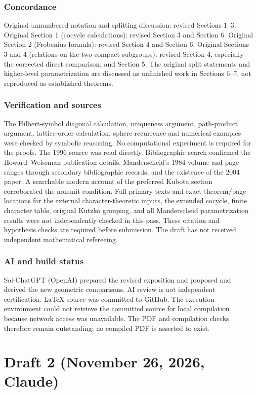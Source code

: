 \documentclass[12pt,letterpaper]{article}
\begin{document}
\section{Concordance}
Original unnumbered notation and splitting discussion: revised Sections 1--3.
Original Section 1 (cocycle calculations): revised Section 3 and Section 6.
Original Section 2 (Frobenius formula): revised Section 4 and Section 6.
Original Sections 3 and 4 (relations on the two compact subgroups): revised Section 4, especially the corrected direct comparison, and Section 5.
The original split statements and higher-level parametrization are discussed as unfinished work in Sections 6--7, not reproduced as established theorems.
\section{Verification and sources}
The Hilbert-symbol diagonal calculation, uniqueness argument, path-product argument, lattice-order calculation, sphere recurrence and numerical examples were checked by symbolic reasoning. No computational experiment is required for the proofs. The 1996 source was read directly. Bibliographic search confirmed the Howard--Weissman publication details, Manderscheid's 1984 volume and page ranges through secondary bibliographic records, and the existence of the 2004 paper. A searchable modern account of the preferred Kubota section corroborated the nonunit condition. Full primary texts and exact theorem/page locations for the external character-theoretic inputs, the extended cocycle, finite character table, original Kutzko grouping, and all Manderscheid parametrization results were not independently checked in this pass. These citation and hypothesis checks are required before submission. The draft has not received independent mathematical refereeing.
\section{AI and build status}
Sol-ChatGPT (OpenAI) prepared the revised exposition and proposed and derived the new geometric comparisons. AI review is not independent certification. LaTeX source was committed to GitHub. The execution environment could not retrieve the committed source for local compilation because network access was unavailable. The PDF and compilation checks therefore remain outstanding; no compiled PDF is asserted to exist.
\part*{Draft 2 (November 26, 2026, Claude)}
\end{document}
